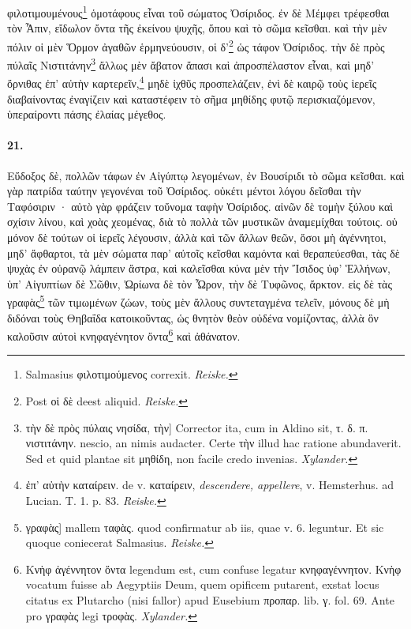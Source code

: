 \documentclass[a4paper, 11pt, oneside, polutonikogreek, german, landscape]{article}
\begin{document}
φιλοτιμουμένους\footnote{Salmasius φιλοτιμούμενος correxit. \emph{Reiske.}} ὁμοτάφους εἶναι τοῦ σώματος Ὀσίριδος. ἐν δὲ Μέμφει τρέφεσθαι τὸν Ἆπιν, εἴδωλον ὄντα τῆς ἐκείνου ψυχῆς, ὅπου καὶ τὸ σῶμα κεῖσθαι. καὶ τὴν μὲν πόλιν οἱ μὲν Ὅρμον ἀγαθῶν ἑρμηνεύουσιν, οἱ δ'\footnote{Post οἱ δὲ deest aliquid. \emph{Reiske.}} ὡς τάφον Ὀσίριδος. τὴν δὲ πρὸς πύλαῖς Νιστιτάνην\footnote{τὴν δὲ πρὸς πύλαις νησίδα, τὴν] Corrector ita, cum in Aldino sit, τ. δ. π. νιστιτάνην. nescio, an nimis audacter. Certe τὴν illud hac ratione abundaverit. Sed et quid plantae sit μηθίδη, non facile credo invenias. \emph{Xylander.}} ἄλλως μὲν ἄβατον ἅπασι καὶ ἀπροσπέλαστον εἶναι, καὶ μηδ' ὄρνιθας ἐπ' αὐτὴν καρτερεῖν,\footnote{ἐπ' αὐτὴν καταίρειν. de v. καταίρειν, \emph{descendere, appellere}, v. Hemsterhus. ad Lucian. T. 1. p. 83. \emph{Reiske.}} μηδὲ ἰχθῦς προσπελάζειν, ἑνὶ δὲ καιρῷ τοὺς ἱερεῖς διαβαίνοντας ἐναγίζειν καὶ καταστέφειν τὸ σῆμα μηθίδης φυτῷ περισκιαζόμενον, ὑπεραίροντι πάσης ἐλαίας μέγεθος.

\paragraph{21.}
Εὔδοξος δὲ, πολλῶν τάφων ἐν Αἰγύπτῳ λεγομένων, ἐν Βουσίριδι τὸ σῶμα κεῖσθαι. καὶ γὰρ πατρίδα ταύτην γεγονέναι τοῦ Ὀσίριδος. οὐκέτι μέντοι λόγου δεῖσθαι τὴν Ταφόσιριν · αὐτὸ γὰρ φράζειν τοὔνομα ταφὴν Ὀσίριδος. αἰνῶν δὲ τομὴν ξύλου καὶ σχίσιν λίνου, καὶ χοὰς χεομένας, διὰ τὸ πολλὰ τῶν μυστικῶν ἀναμεμίχθαι τούτοις. οὐ μόνον δὲ τούτων οἱ ἱερεῖς λέγουσιν, ἀλλὰ καὶ τῶν ἄλλων θεῶν, ὅσοι μὴ ἀγέννητοι, μηδ' ἄφθαρτοι, τὰ μὲν σώματα παρ' αὐτοῖς κεῖσθαι καμόντα καὶ θεραπεύεσθαι, τὰς δὲ ψυχὰς ἐν οὐρανῷ λάμπειν ἄστρα, καὶ καλεῖσθαι κύνα μὲν τὴν Ἴσιδος ὑφ' Ἑλλήνων, ὑπ' Αἰγυπτίων δὲ Σῶθιν, Ὠρίωνα δὲ τὸν Ὦρον, τὴν δὲ Τυφῶνος, ἄρκτον. εἰς δὲ τὰς γραφὰς\footnote{γραφὰς] mallem ταφὰς. quod confirmatur ab iis, quae v. 6. leguntur. Et sic quoque coniecerat Salmasius. \emph{Reiske.}} τῶν τιμωμένων ζώων, τοὺς μὲν ἄλλους συντεταγμένα τελεῖν, μόνους δὲ μὴ διδόναι τοὺς Θηβαΐδα κατοικοῦντας, ὡς θνητὸν θεὸν οὐδένα νομίζοντας, ἀλλὰ ὃν καλοῦσιν αὐτοὶ κνηφαγένητον ὄντα\footnote{Κνὴφ ἀγέννητον ὄντα legendum est, cum confuse legatur κνηφαγέννητον. Κνὴφ vocatum fuisse ab Aegyptiis Deum, quem opificem putarent, exstat locus citatus ex Plutarcho (nisi fallor) apud Eusebium προπαρ. lib. γ. fol. 69. Ante pro γραφὰς legi τροφὰς. \emph{Xylander.}} καὶ ἀθάνατον.
\end{document}
